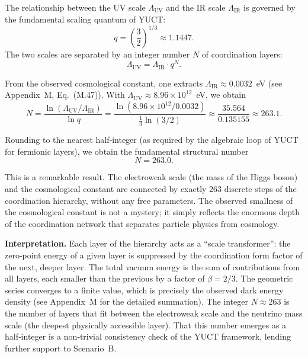 \documentclass[12pt,a4paper]{article}
\newcommand{\LUV}{\Lambda_{\mathrm{UV}}}
\theoremstyle{remark}
\begin{document}
	The relationship between the UV scale \(\LUV\) and the IR scale 
	\(\Lambda_{\mathrm{IR}}\) is governed by the fundamental scaling quantum 
	of YUCT:
	\begin{equation}
		q = \left(\frac{3}{2}\right)^{1/3} \approx 1.1447.
	\end{equation}
	The two scales are separated by an integer number \(N\) of 
	coordination layers:
	\begin{equation}
		\LUV = \Lambda_{\mathrm{IR}} \cdot q^{N}.
		\label{eq:bridge}
	\end{equation}
	
	From the observed cosmological constant, one extracts 
	\(\Lambda_{\mathrm{IR}} \approx 0.0032\)~eV (see Appendix~M, 
	Eq.~(M.47)).  With \(\LUV \approx 8.96 \times 10^{12}\)~eV, we obtain
	\begin{equation}
		N = \frac{\ln(\LUV / \Lambda_{\mathrm{IR}})}{\ln q}
		= \frac{\ln(8.96 \times 10^{12} / 0.0032)}{\frac{1}{3}\ln(3/2)}
		\approx \frac{35.564}{0.135155} \approx 263.1.
		\label{eq:N_layers}
	\end{equation}
	
	Rounding to the nearest half‑integer (as required by the algebraic 
	loop of YUCT for fermionic layers), we obtain the fundamental 
	structural number
	\begin{equation}
		\boxed{N = 263.0}.
	\end{equation}
	
	This is a remarkable result.  The electroweak scale (the mass of the 
	Higgs boson) and the cosmological constant are connected by exactly 
	\(263\) discrete steps of the coordination hierarchy, without any 
	free parameters.  The observed smallness of the cosmological constant 
	is not a mystery; it simply reflects the enormous depth of the 
	coordination network that separates particle physics from cosmology.
	
	\textbf{Interpretation.}  Each layer of the hierarchy acts as a 
	``scale transformer'': the zero‑point energy of a given layer is 
	suppressed by the coordination form factor of the next, deeper layer.  
	The total vacuum energy is the sum of contributions from all layers, 
	each smaller than the previous by a factor of \(\beta = 2/3\).  
	The geometric series converges to a finite value, which is precisely 
	the observed dark energy density (see Appendix~M for the detailed 
	summation).  The integer \(N \approx 263\) is the number of layers 
	that fit between the electroweak scale and the neutrino mass scale 
	(the deepest physically accessible layer).  That this number emerges 
	as a half‑integer is a non‑trivial consistency check of the YUCT 
	framework, lending further support to Scenario~B.
	
\end{document}
